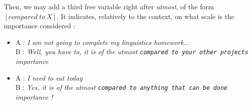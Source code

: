 \documentclass{article}
\begin{document}
\begin{enumerate}
    Then, we may add a third free variable right after \textsl{utmost}, of the form $\left[compared\ to \ X\right]$. It indicates, relatively to the context, on what scale is the importance considered : 
    \begin{itemize}
        \item A : \textsl{I am not going to complete my linguistics homework...}\\
        B : \textsl{Well, you have to, it is of the utmost \texttt{compared to your other projects} importance}
        \item A : \textsl{I need to eat today}\\
        B : \textsl{Yes, it is of the utmost \texttt{compared to anything that can be done} importance !}
    \end{itemize}

\end{enumerate}
\end{document}
